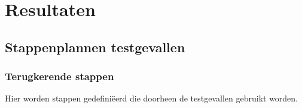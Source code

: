 
\chapter{Resultaten}
\label{ch:resultaten}

\section{Stappenplannen testgevallen}

\subsection{Terugkerende stappen}
\label{recurringsteps}

Hier worden stappen gedefiniëerd die doorheen de testgevallen gebruikt worden.

